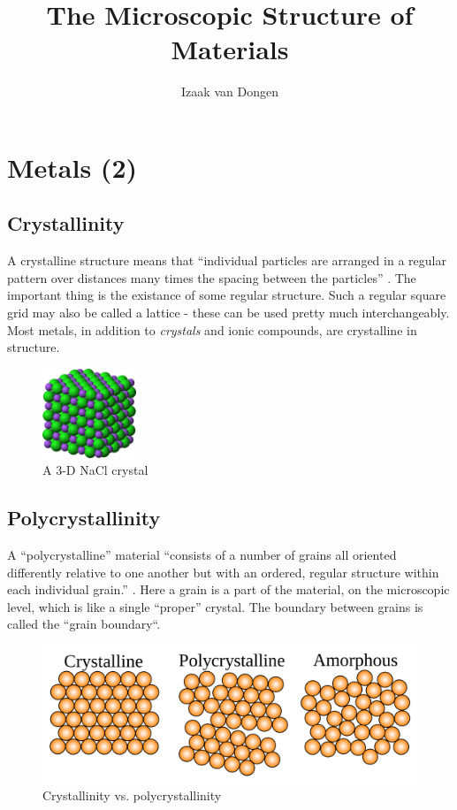 \documentclass{article}
\title{The Microscopic Structure of Materials}
\author{Izaak van Dongen}
\begin{document}
    \maketitle
    \tableofcontents
    \section{Metals (2)}
    \subsection{Crystallinity}
    A crystalline structure means that ``individual particles are arranged in a
    regular pattern over distances many times the spacing between the
    particles'' \cite[p.~96]{OCRPhysics}. The important thing is the existance
    of some regular structure. Such a regular square grid may also be called a
    lattice - these can be used pretty much interchangeably. Most metals, in
    addition to \textit{crystals} and ionic compounds, are crystalline in
    structure.
    \begin{figure}[h]
        \includegraphics[width=0.25\textwidth]{crystal}
        \centering
        \caption{A 3-D NaCl crystal}
    \end{figure}
    \subsection{Polycrystallinity}
    A ``polycrystalline'' material ``consists of a number of grains all
    oriented differently relative to one another but with an ordered, regular
    structure within each individual grain.'' \cite[p.~98]{OCRPhysics}. Here a
    grain is a part of the material, on the microscopic level, which is like a
    single ``proper'' crystal. The boundary between grains is called the
    ``grain boundary``.
    \begin{figure}[h]
        \includegraphics[width=\textwidth]{crystal_and_poly}
        \centering
        \caption{Crystallinity vs. polycrystallinity}
    \end{figure}
\end{document}
